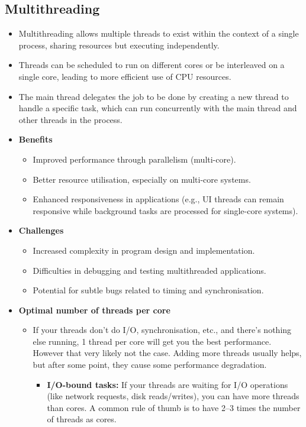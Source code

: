 \documentclass{article}
\begin{document}
\subsection{Multithreading}
\begin{itemize}
  \item Multithreading allows multiple threads to exist within the context of a single process, sharing resources but executing independently.
  \item Threads can be scheduled to run on different cores or be interleaved on a single core, leading to more efficient use of CPU resources.
  \item The main thread delegates the job to be done by creating a new thread to handle a specific task, which can run concurrently with the main thread and other threads in the process.
  \item \textbf{Benefits}
  \begin{itemize}
    \item Improved performance through parallelism (multi-core).
    \item Better resource utilisation, especially on multi-core systems.
    \item Enhanced responsiveness in applications (e.g., UI threads can remain responsive while background tasks are processed for single-core systems).
  \end{itemize}
  \item \textbf{Challenges}
  \begin{itemize}
    \item Increased complexity in program design and implementation.
    \item Difficulties in debugging and testing multithreaded applications.
    \item Potential for subtle bugs related to timing and synchronisation.
  \end{itemize}
  \item \textbf{Optimal number of threads per core}
  \begin{itemize}
    \item If your threads don't do I/O, synchronisation, etc., and there's nothing else running, 1 thread per core will get you the best performance. However that very likely not the case. Adding more threads usually helps, but after some point, they cause some performance degradation.
    \begin{itemize}
      \item \textbf{I/O-bound tasks:} If your threads are waiting for I/O operations (like network requests, disk reads/writes), you can have more threads than cores. A common rule of thumb is to have 2--3 times the number of threads as cores.

\end{itemize}
\end{itemize}
\end{itemize}
\end{document}
